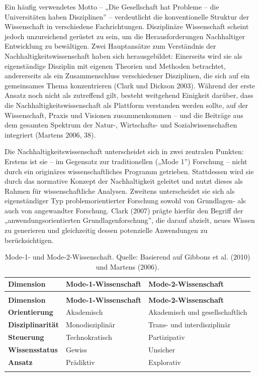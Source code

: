 \documentclass[
  nswissgerman,
  a4paper,
  DIV=11,
  numbers=noendperiod,
  oneside,
  openany]{scrreprt}
\begin{document}
Ein häufig verwendetes Motto -- „Die Gesellschaft hat Probleme -- die
Universitäten haben Disziplinen'' -- verdeutlicht die konventionelle
Struktur der Wissenschaft in verschiedene Fachrichtungen. Disziplinäre
Wissenschaft scheint jedoch unzureichend gerüstet zu sein, um die
Herausforderungen Nachhaltiger Entwicklung zu bewältigen. Zwei
Hauptansätze zum Verständnis der Nachhaltigkeitswissenschaft haben sich
herausgebildet: Einerseits wird sie als eigenständige Disziplin mit
eigenen Theorien und Methoden betrachtet, andererseits als ein
Zusammenschluss verschiedener Disziplinen, die sich auf ein gemeinsames
Thema konzentrieren (Clark und Dickson 2003). Während der erste Ansatz
noch nicht als zutreffend gilt, besteht weitgehend Einigkeit darüber,
dass die Nachhaltigkeitswissenschaft als Plattform verstanden werden
sollte, auf der Wissenschaft, Praxis und Visionen zusammenkommen -- und
die Beiträge aus dem gesamten Spektrum der Natur-, Wirtschafts- und
Sozialwissenschaften integriert (Martens 2006, 38).

Die Nachhaltigkeitswissenschaft unterscheidet sich in zwei zentralen
Punkten: Erstens ist sie -- im Gegensatz zur traditionellen („Mode 1'')
Forschung -- nicht durch ein originäres wissenschaftliches Programm
getrieben. Stattdessen wird sie durch das normative Konzept der
Nachhaltigkeit geleitet und nutzt dieses als Rahmen für
wissenschaftliche Analysen. Zweitens unterscheidet sie sich als
eigenständiger Typ problemorientierter Forschung sowohl von Grundlagen-
als auch von angewandter Forschung. Clark (2007) prägte hierfür den
Begriff der „anwendungsorientierten Grundlagenforschung'', die darauf
abzielt, neues Wissen zu generieren und gleichzeitig dessen potenzielle
Anwendungen zu berücksichtigen.

\begingroup\fontsize{8}{10}\selectfont

\begin{longtable}[t]{>{\raggedright\arraybackslash}p{4.5cm}>{\raggedright\arraybackslash}p{4.5cm}l}

\caption{\label{tbl-mode1-mode2-science}Mode-1- und Mode-2-Wissenschaft.
Quelle: Basierend auf Gibbons et al. (2010) und Martens (2006).}

\tabularnewline

\toprule
\textbf{Dimension} & \textbf{Mode-1-Wissenschaft} & \textbf{Mode-2-Wissenschaft}\\
\midrule
\endfirsthead
\multicolumn{3}{@{}l}{\textit{(continued)}}\\
\toprule
\textbf{Dimension} & \textbf{Mode-1-Wissenschaft} & \textbf{Mode-2-Wissenschaft}\\
\midrule
\endhead

\endfoot
\bottomrule
\endlastfoot
\textbf{Orientierung} & Akademisch & Akademisch und gesellschaftlich\\
\textbf{Disziplinarität} & Monodisziplinär & Trans- und interdisziplinär\\
\textbf{Steuerung} & Technokratisch & Partizipativ\\
\textbf{Wissensstatus} & Gewiss & Unsicher\\
\textbf{Ansatz} & Prädiktiv & Explorativ\\*

\end{longtable}
\end{document}
